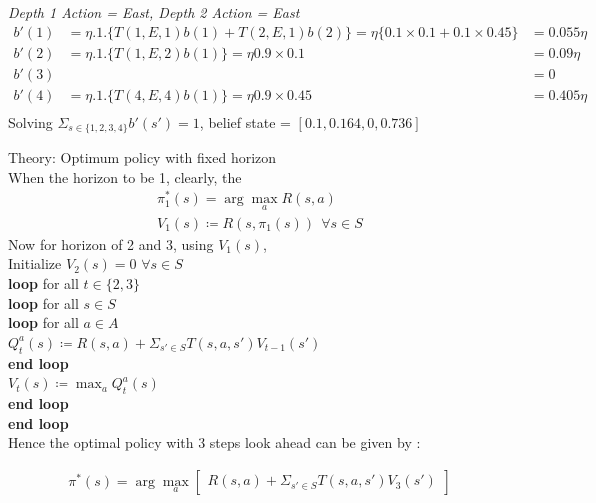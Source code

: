 \documentclass[12pt]{article}
\newcommand{\argmax}{\arg\!\max}
\newenvironment{problem}[2][\large Problem]{\begin{trivlist}
\item[\hskip \labelsep {\bfseries #1}\hskip \labelsep {\bfseries #2.}]}{\end{trivlist}}
\begin{document}
\textit{Depth 1 Action = East, Depth 2 Action = East}
\begin{align}
b'(1) &= \eta.1.\{T(1,E,1)b(1) + T(2,E,1)b(2)\}=\eta\{0.1\times0.1 + 0.1\times0.45\} &= 0.055\eta \nonumber\\
b'(2) &= \eta.1.\{T(1,E,2)b(1) \}=\eta 0.9\times0.1 &= 0.09\eta \nonumber\\
b'(3) & &=0 \nonumber\\
b'(4) &= \eta.1.\{T(4,E,4)b(1) \}=\eta 0.9\times0.45 &= 0.405\eta \nonumber\\
\nonumber
\end{align}
Solving $\Sigma_{s \in \{1,2,3,4\}} b'(s')=1$, belief state = $[ 0.1,0.164,0,
0.736]$ \\

\begin{problem} {7} Theory: Optimum policy with fixed horizon\\

When the horizon to be 1, clearly, the 
\begin{align}
	\pi^*_1(s)= \argmax_a  R(s,a) \nonumber\\
	V_1(s)\coloneqq R(s,\pi_1(s)) ~~\forall s \in S
	\nonumber
\end{align}	
Now for horizon of 2 and 3, using $V_1(s)$,\\

Initialize $V_2(s) = 0 $  $\forall s \in S $\\
\textbf{loop} for all $ t \in \{2,3\}$ \\
\hspace*{10mm}\textbf{loop} for all $ s \in S$ \\
\hspace*{10mm}\hspace*{10mm} \textbf{loop} for all $ a \in A$\\
\hspace*{10mm}\hspace*{10mm}\hspace*{10mm} $Q_t^a(s) \coloneqq R(s,a) + \Sigma_{s' \in S} T(s,a,s') V_{t-1}(s') $\\
\hspace*{10mm}\hspace*{10mm} \textbf{end loop}\\
\hspace*{10mm}\hspace*{10mm} $V_t(s) \coloneqq \max_a Q^a_t(s)$\\
\hspace*{10mm} \textbf{end loop}\\
\textbf{end loop}\\

Hence the optimal policy with 3 steps look ahead can be given by :

\begin{align}
\pi^*(s)= \argmax_a \begin{bmatrix} R(s,a) + \Sigma_{s' \in S} T(s,a,s')V_3(s')     \end{bmatrix} \nonumber
\end{align}

\end{problem}
\end{document}
